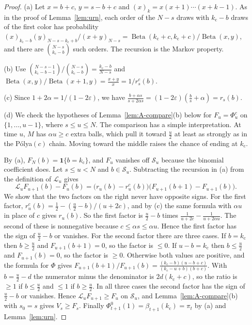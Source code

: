 \begin{proof}
(a) Let $x=b+c$, $y=s-b+c$ and $(x)_k=x(x+1)\cdots(x+k-1)$. As in the proof
of Lemma~\ref{lem:urn}, each order of the $N-s$ draws with ${k_{\mathrm c}}-b$ draws of
the first color has probability
$(x)_{{k_{\mathrm c}}-b}(y)_{N-s-{k_{\mathrm c}}+b}/(x+y)_{N-s}=\operatorname{Beta}({k_{\mathrm c}}+c,{k_{\mathrm c}}+c)/\operatorname{Beta}(x,y)$, and
there are $\binom{N-s}{{k_{\mathrm c}}-b}$ such orders. The recursion is the Markov
property.

(b) Use $\binom{N-s-1}{{k_{\mathrm c}}-b-1}/\binom{N-s}{{k_{\mathrm c}}-b}=\frac{{k_{\mathrm c}}-b}{N-s}$ and
$\operatorname{Beta}(x,y)/\operatorname{Beta}(x+1,y)=\frac{x+y}x=1/r^c_s(b)$.

(c) Since $1+2\alpha=1/(1-2\varepsilon)$, we have
$\frac{b+\alpha s}{s+2\alpha s}=(1-2\varepsilon)(\frac bs+\alpha)=r_s(b)$.

(d) We check the hypotheses of Lemma~\ref{lem:A-compare}(b) below for
$F_u=\Phi^c_u$ on $\{1,\dots,u-1\}$, where $s\le u\le N$. The comparison has a simple interpretation. At time $u$, $M$ has $\alpha u\ge c$ extra balls, which pull it toward $\frac u2$ at least as strongly as in the P\'olya$(c)$ chain. Moving toward the middle raises the chance of ending at ${k_{\mathrm c}}$.

By (a), $F_N(b)=\mathbf 1\{b={k_{\mathrm c}}\}$, and $F_u$ vanishes off $\mathcal S_u$
because the binomial coefficient does. Let $s\le u<N$ and
$b\in\mathcal S_u$. Subtracting the recursion in (a) from the definition of
$\mathcal L_u$ gives
\[
 \mathcal L_uF_{u+1}(b)-F_u(b)
 =\bigl(r_u(b)-r^c_u(b)\bigr)\bigl(F_{u+1}(b+1)-F_{u+1}(b)\bigr).
\]
We show that the two factors on the right never have opposite signs. For the
first factor, $r^c_u(b)=\frac12-(\frac u2-b)/(u+2c)$, and by (c) the same
formula with $\alpha u$ in place of $c$ gives $r_u(b)$. So the first factor
is $\frac u2-b$ times $\frac1{u+2c}-\frac1{u+2\alpha u}$. The second of these
is nonnegative because $c\le\alpha s\le\alpha u$. Hence the first factor has
the sign of $\frac u2-b$ or vanishes. For the second factor there are
three cases. If $b={k_{\mathrm c}}$ then $b\ge\frac u2$ and $F_{u+1}(b+1)=0$, so the factor
is $\le0$. If $u-b={k_{\mathrm c}}$ then $b\le\frac u2$ and $F_{u+1}(b)=0$, so the factor
is $\ge0$. Otherwise both values are positive, and the formula for $\Phi$
gives
$F_{u+1}(b+1)/F_{u+1}(b)=\frac{({k_{\mathrm c}}-b)(u-b+c)}{({k_{\mathrm c}}-u+b)(b+c)}$. With
$b=\frac u2-d$ the numerator minus the denominator is $2d({k_{\mathrm c}}+c)$, so the
ratio is $\ge1$ if $b\le\frac u2$ and $\le1$ if $b\ge\frac u2$. In all three
cases the second factor has the sign of $\frac u2-b$ or vanishes. Hence $\mathcal L_uF_{u+1}\ge F_u$ on $\mathcal S_u$, and
Lemma~\ref{lem:A-compare}(b) with $s_0=s$ gives $V_s\ge F_s$. Finally
$\Phi^0_{t+1}(1)=\beta_{t+1}({k_{\mathrm c}})=\pi_t$ by (a) and Lemma~\ref{lem:urn}.
\end{proof}

